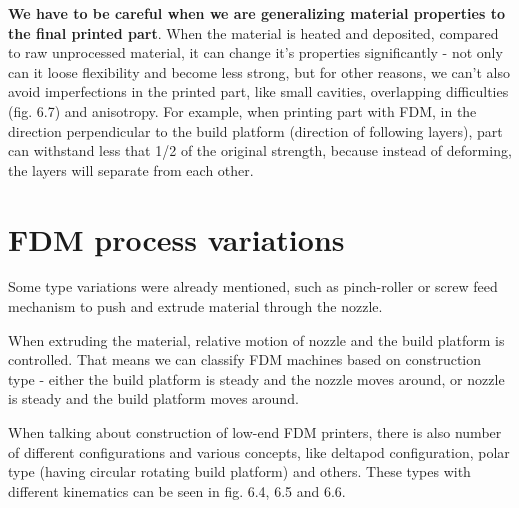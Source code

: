 \documentclass[a4paper, 11pt, reqno]{report}
\begin{document}
\textbf{We have to be careful when we are generalizing material properties to the final printed part}. When the material is heated and deposited, compared to raw unprocessed material, it can change it's properties significantly - not only can it loose flexibility and become less strong, but for other reasons, we can't also avoid imperfections in the printed part, like small cavities, overlapping difficulties (fig. 6.7) and anisotropy. For example, when printing part with FDM, in the direction perpendicular to the build platform (direction of following layers), part can withstand less that 1/2 of the original strength, because instead of deforming, the layers will separate from each other.

\section{FDM process variations}
Some type variations were already mentioned, such as pinch-roller or screw feed mechanism to push and extrude material through the nozzle.

	When extruding the material, relative motion of nozzle and the build platform is controlled. That means we can classify FDM machines based on construction type - either the build platform is steady and the nozzle moves around, or nozzle is steady and the build platform moves around.
	
	When talking about construction of low-end FDM printers, there is also number of different configurations and various concepts, like deltapod configuration, polar type (having circular rotating build platform) and others. These types with different kinematics can be seen in fig. 6.4, 6.5 and 6.6.
\end{document}
